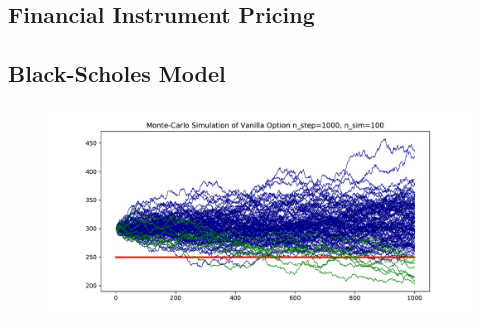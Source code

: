 \begin{heur}
 \section{Financial Instrument Pricing}
 \subsection{Black-Scholes Model}
 \begin{figure}
 	\centering
 	\includegraphics[width=0.8\linewidth]{numerical/figures/mcoption}
 	\caption{}
 	\label{fig:mcoption}
 \end{figure}
 
 
 
 	
\end{heur}